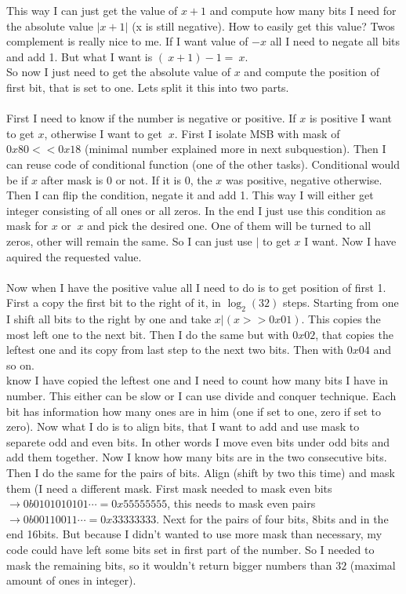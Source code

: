 \documentclass[a4paper]{article}
\begin{document}
\noindent This way I can just get the value of $x + 1$ and compute how many bits I need for the absolute
value $|x + 1|$ (x is still negative). How to easily get this value? Twos complement
is really nice to me. If I want value of $-x$ all I need to negate all bits and add 1.
But what I want is $(~x + 1) - 1 = ~x$. \\

\noindent So now I just need to get the absolute value of $x$ and compute the position of first bit, that
is set to one. Lets split it this into two parts. \\

 \\

\noindent First I need to know if the number is negative or positive. If $x$ is positive I want to 
get $x$, otherwise I want to get $~x$. First I isolate MSB with mask of $0x80 << 0x18$ (minimal number
explained more in next subquestion). Then I can reuse code of conditional function (one of the other
tasks). Conditional would be if $x$ after mask is 0 or not. If it is 0, the $x$ was positive, negative
otherwise. Then I can flip the condition, negate it and add 1. This way I will either get integer
consisting of all ones or all zeros. In the end I just use this condition as mask for $x$ or $~x$ 
and pick the desired one. One of them will be turned to all zeros, other will remain the same.
So I can just use $|$ to get $x$ I want. Now I have aquired the requested value. \\
 
 \\

\noindent Now when I have the positive value all I need to do is to get position of first 1. 
First a copy the first bit to the right of it, in $\log_{2}(32)$ steps. Starting from one
I shift all bits to the right by one and take $x | (x >> 0x01)$. This copies the most left one
to the next bit. Then I do the same but with $0x02$, that copies the leftest one and its copy from
last step to the next two bits. Then with $0x04$ and so on. \\
\noindent know I have copied the leftest one and I need to count how many bits I have in number.
This either can be slow or I can use divide and conquer technique. Each bit has information how
many ones are in him (one if set to one, zero if set to zero). Now what I do is to align bits, that
I want to add and use mask to separete odd and even bits. In other words I move even bits under
odd bits and add them together. Now I know how many bits are in the two consecutive bits. Then
I do the same for the pairs of bits. Align (shift by two this time) and mask them (I need
a different mask. First mask needed to mask even bits $\rightarrow 0b0101010101\cdots = 0x55555555$,
this needs to mask even pairs $\rightarrow 0b00110011\cdots = 0x33333333$.
Next for the pairs of four bits, 8bits and in the end 16bits. But because I didn't wanted to use
more mask than necessary, my code could have left some bits set in first part of the number. 
So I needed to mask the remaining bits, so it wouldn't return bigger numbers than $32$ (maximal
amount of ones in integer).
\\
\end{document}

